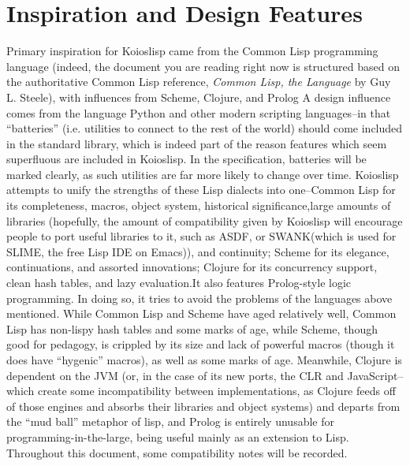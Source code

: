 \documentclass[10pt]{book}
\begin{document}
\chapter{Inspiration and Design Features}
Primary inspiration for {\sc Koioslisp} came from the {\sc Common Lisp} programming language (indeed, the document you are reading right now is structured based on the authoritative {\sc Common Lisp} reference, \textit{Common Lisp, the Language} by Guy L. Steele), with influences from {\sc Scheme}, {\sc Clojure}, and {\sc Prolog} A design influence comes from the language {\sc Python} and other modern scripting languages--in that ``batteries'' (i.e. utilities to connect to the rest of the world) should come included in the standard library, which is indeed part of the reason features which seem superfluous are included in {\sc Koioslisp}. In the specification, batteries will be marked clearly, as such utilities are far more likely to change over time. {\sc Koioslisp} attempts to unify the strengths of these Lisp dialects into one--{\sc Common Lisp} for its completeness, macros, object system, historical significance,large amounts of libraries (hopefully, the amount of compatibility given by {\sc Koioslisp} will encourage people to port useful libraries to it, such as ASDF, or SWANK(which is used for SLIME, the free Lisp IDE on Emacs)), and continuity; {\sc Scheme} for its elegance, continuations, and assorted innovations; {\sc Clojure} for its concurrency support, clean hash tables, and lazy evaluation.It also features {\sc Prolog}-style logic programming. In doing so, it tries to avoid the problems of the languages above mentioned. While {\sc Common Lisp} and {\sc Scheme} have aged relatively well, {\sc Common Lisp} has non-lispy hash tables and some marks of age, while {\sc Scheme}, though good for pedagogy, is crippled by its size and lack of powerful macros (though it does have ``hygenic'' macros), as well as some marks of age. Meanwhile, {\sc Clojure} is dependent on the JVM (or, in the case of its new ports, the CLR and JavaScript--which create some incompatibility between implementations, as {\sc Clojure} feeds off of those engines and absorbs their libraries and object systems) and departs from the ``mud ball'' metaphor of lisp, and {\sc Prolog} is entirely unusable for programming-in-the-large, being useful mainly as an extension to Lisp. Throughout this document, some compatibility notes will be recorded.
\end{document}
